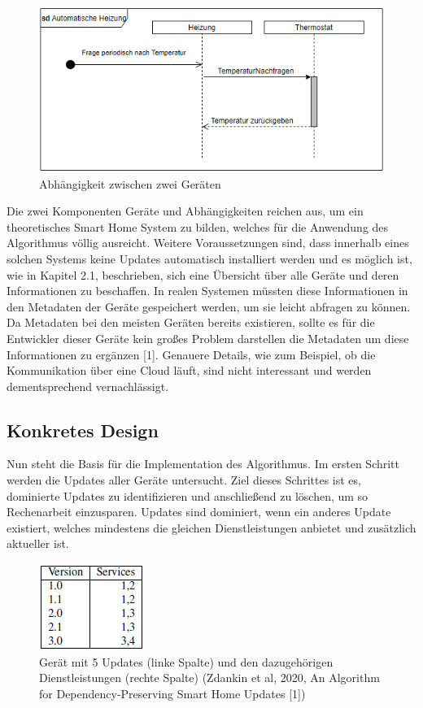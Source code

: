 \begin{figure}[h]
\centering
\includegraphics{"images/Heizung"}
\caption{Abhängigkeit zwischen zwei Geräten}
\label{fig:Prob1:MEA}
\end{figure}
\newpage
Die zwei Komponenten Geräte und Abhängigkeiten reichen aus, um ein theoretisches Smart Home System zu bilden, welches für die Anwendung
des Algorithmus völlig ausreicht. Weitere Voraussetzungen sind, dass innerhalb eines solchen Systems keine Updates automatisch
installiert werden und es möglich ist, wie in Kapitel 2.1, beschrieben, sich eine Übersicht über alle Geräte und deren Informationen zu
beschaffen. In realen Systemen müssten diese Informationen in den Metadaten der Geräte
gespeichert werden, um sie leicht abfragen zu können. Da Metadaten bei den meisten
Geräten bereits existieren, sollte es für die Entwickler dieser Geräte kein großes Problem darstellen die Metadaten
um diese Informationen zu ergänzen [1]. Genauere Details, wie zum Beispiel, ob die Kommunikation über eine Cloud läuft, sind nicht
interessant und werden dementsprechend vernachlässigt.

\subsection{Konkretes Design}
Nun steht die Basis für die Implementation des Algorithmus. Im ersten Schritt werden die Updates aller Geräte untersucht. 
Ziel dieses Schrittes ist es, dominierte Updates zu identifizieren und anschließend zu löschen, um so Rechenarbeit einzusparen.
Updates sind dominiert,
wenn ein anderes Update existiert, welches mindestens die gleichen Dienstleistungen anbietet und zusätzlich aktueller ist.

\begin{figure}[h]
\begin{center}
\includegraphics{"images/Versions"}
\caption{Gerät mit 5 Updates (linke Spalte) und den dazugehörigen Dienstleistungen (rechte Spalte) (Zdankin et al, 2020, An Algorithm for Dependency-Preserving Smart Home Updates [1])}
\label{fig:Prob1:MEA}
\end{center}
\end{figure}

